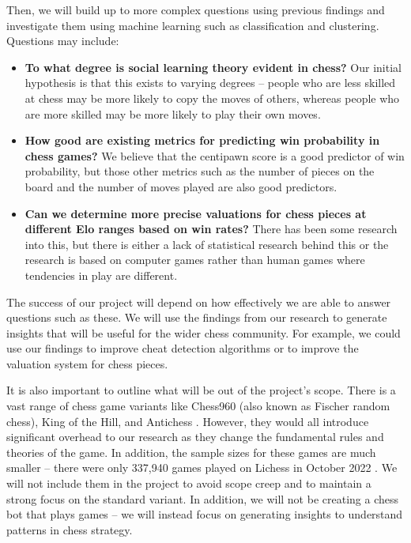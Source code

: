 \documentclass[%
 superscriptaddress,
showpacs,preprintnumbers,
 amsmath,
 amssymb,
 aps,
 pra,
showkeys,
onecolumn,
notitlepage,
11pt,
tightenlines      %
]{revtex4-1}
\begin{document}
Then, we will build up to more complex questions using previous findings and investigate them using machine learning such as classification and clustering. Questions may include:

\begin{itemize}
    \setlength\itemsep{-0.5em}
    \item \textbf{To what degree is social learning theory evident in chess?} Our initial hypothesis is that this exists to varying degrees -- people who are less skilled at chess may be more likely to copy the moves of others, whereas people who are more skilled may be more likely to play their own moves.
    \item \textbf{How good are existing metrics for predicting win probability in chess games?} We believe that the centipawn score is a good predictor of win probability, but those other metrics such as the number of pieces on the board and the number of moves played are also good predictors.
    \item \textbf{Can we determine more precise valuations for chess pieces at different Elo ranges based on win rates?} There has been some research into this, but there is either a lack of statistical research behind this or the research is based on computer games rather than human games where tendencies in play are different.
\end{itemize}

The success of our project will depend on how effectively we are able to answer questions such as these. We will use the findings from our research to generate insights that will be useful for the wider chess community. For example, we could use our findings to improve cheat detection algorithms or to improve the valuation system for chess pieces.

It is also important to outline what will be out of the project's scope. There is a vast range of chess game variants like Chess960 (also known as Fischer random chess), King of the Hill, and Antichess \cite{lichessBlitzRatingDistribution}. However, they would all introduce significant overhead to our research as they change the fundamental rules and theories of the game. In addition, the sample sizes for these games are much smaller -- there were only 337,940 games played on Lichess in October 2022 \cite{lichessOpenDatabase}. We will not include them in the project to avoid scope creep and to maintain a strong focus on the standard variant. In addition, we will not be creating a chess bot that plays games -- we will instead focus on generating insights to understand patterns in chess strategy.
\end{document}
